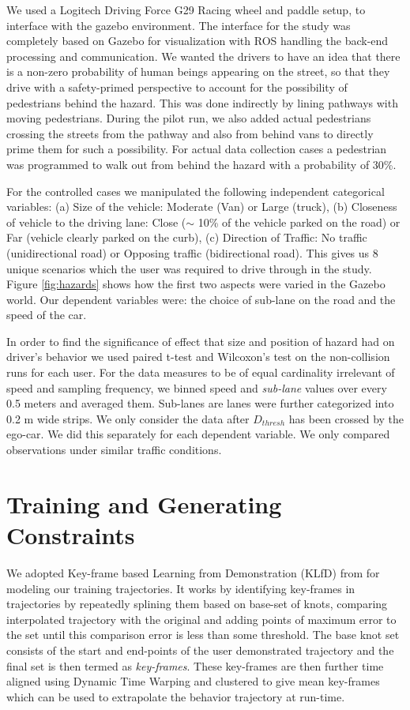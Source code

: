\documentclass{article}
\begin{document}
We used a Logitech Driving Force G29 Racing wheel and paddle setup, to interface with 
the gazebo environment.
The interface for the study was completely based on Gazebo for visualization 
with ROS handling the back-end processing and communication. 
We wanted the drivers to have an idea that there is a non-zero probability of human beings 
appearing on the street, so that they drive with a safety-primed perspective to
account for the possibility of pedestrians behind the hazard. 
This was done indirectly by lining 
pathways with moving pedestrians. During the pilot run, we also added actual pedestrians 
crossing the streets from the pathway and also from behind vans to directly prime them for 
such a possibility. For actual data collection cases a pedestrian was programmed to walk out
from behind the hazard with a probability of 30\%.

For the controlled cases we manipulated the following independent categorical variables: (a) Size of the 
vehicle: Moderate (Van) or Large (truck), (b) Closeness of vehicle to the driving lane: Close ($\sim$ 10\%
of the vehicle parked on the road) or Far (vehicle clearly parked on the curb), (c) Direction of Traffic: 
No traffic (unidirectional road) or Opposing traffic (bidirectional road).
This gives us 8 unique scenarios which the user was required to drive through in the study. 
Figure \ref{fig:hazards} shows how the first two aspects were varied in the Gazebo world. Our 
dependent variables were: the choice of sub-lane on the road and the speed of the car.

In order to find the significance of effect that size and position of hazard 
had on driver's behavior we used paired t-test and Wilcoxon's test on the 
non-collision runs for each user. For the data measures to be of equal cardinality 
irrelevant of speed and sampling frequency, we binned speed and \textit{sub-lane} 
values over every 0.5 meters and averaged them. Sub-lanes are lanes were further 
categorized into 0.2 m wide strips. We only consider the data after $D_{thresh}$ 
has been crossed by the ego-car. We did this separately for each dependent 
variable. We only compared observations under similar traffic conditions.

\section{Training and Generating Constraints}

We adopted Key-frame based Learning from Demonstration (KLfD) from \citet{akgun2012keyframe} 
for modeling our training trajectories. It works by identifying key-frames 
in trajectories by repeatedly splining them based on base-set of knots, comparing
interpolated trajectory with the original and 
adding points of maximum error to the set until this comparison error is less than 
some threshold. The base knot set consists of the start and end-points of the 
user demonstrated trajectory and the final set is then termed as \textit{key-frames}. 
These key-frames are then further time aligned using Dynamic Time Warping 
\cite{berndt1994using} and clustered to give mean key-frames which can be used to 
extrapolate the behavior trajectory at run-time.
\end{document}
